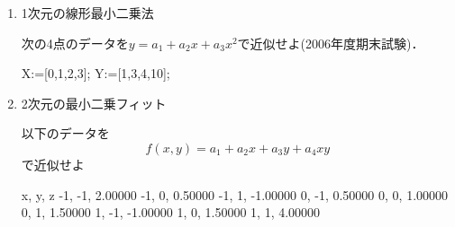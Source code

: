 \begin{enumerate}
\item 1次元の線形最小二乗法

次の4点のデータを$y = a_1+a_2 x+a_3 x^2$で近似せよ(2006年度期末試験)．
\begin{MapleInput}
X:=[0,1,2,3];
Y:=[1,3,4,10];
\end{MapleInput}

\item 2次元の最小二乗フィット

以下のデータを
\begin{equation*}
f(x, y) = a_1+a_2 x+a_3 y+a_4 xy
\end{equation*}
で近似せよ
\begin{MapleError}
 x,  y,  z
-1, -1,  2.00000
-1,  0,  0.50000
-1,  1, -1.00000
 0, -1,  0.50000
 0,  0,  1.00000
 0,  1,  1.50000
 1, -1, -1.00000
 1,  0,  1.50000
 1,  1,  4.00000
\end{MapleError}
\end{enumerate}